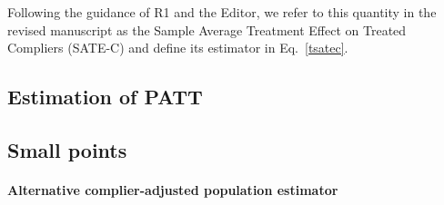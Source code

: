 \documentclass[hidelinks,12pt,letterpaper]{article}
\begin{document}
Following the guidance of R1 and the Editor, we refer to this quantity in the revised manuscript as the Sample Average Treatment Effect on Treated Compliers (SATE-C) and define its estimator in Eq.~\eqref{tsatec}. 

\subsection{Estimation of PATT}


\subsection{Small points}

\paragraph*{Alternative complier-adjusted population estimator}
\end{document}
